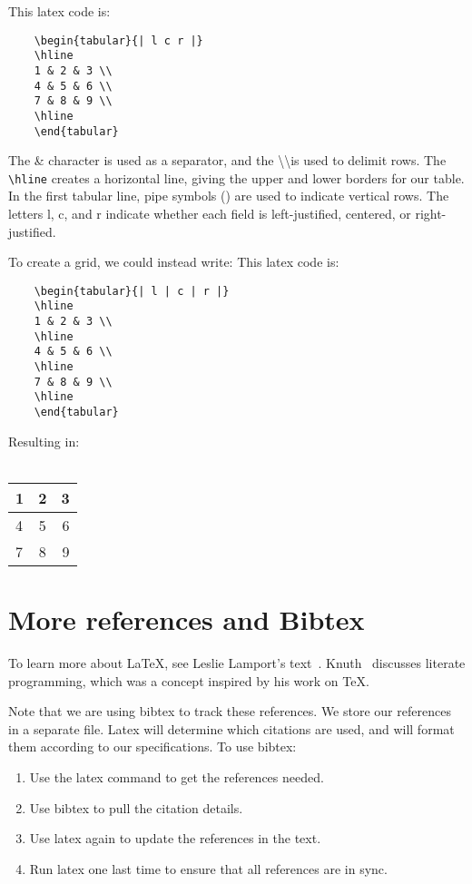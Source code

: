 \documentclass{article}
\begin{document}
\smallskip

This latex code is:
\begin{verbatim}
    \begin{tabular}{| l c r |}
    \hline
    1 & 2 & 3 \\
    4 & 5 & 6 \\
    7 & 8 & 9 \\
    \hline
    \end{tabular}
\end{verbatim}

The \& character is used as a separator,
and the \textbackslash\textbackslash is used to delimit rows.
The {\tt {\textbackslash}hline} creates a horizontal line,
giving the upper and lower borders for our table.
In the first tabular line, pipe symbols (\textbar) are used to indicate vertical rows.
The letters l, c, and r indicate whether each field is left-justified, centered,
or right-justified.

To create a grid, we could instead write:
This latex code is:

\begin{verbatim}
    \begin{tabular}{| l | c | r |}
    \hline
    1 & 2 & 3 \\
    \hline
    4 & 5 & 6 \\
    \hline
    7 & 8 & 9 \\
    \hline
    \end{tabular}
\end{verbatim}

\noindent
Resulting in:~\\~\\

    \begin{tabular}{| l | c | r |}
    \hline
    1 & 2 & 3 \\
    \hline
    4 & 5 & 6 \\
    \hline
    7 & 8 & 9 \\
    \hline
    \end{tabular}

\section{More references and Bibtex}\label{sec:bibtex}
To learn more about LaTeX,
see Leslie Lamport's text~\cite{lamport}.
Knuth~\cite{literate} discusses literate programming,
which was a concept inspired by his work on TeX.

Note that we are using bibtex to track these references.
We store our references in a separate file.
Latex will determine which citations are used,
and will format them according to our specifications.
To use bibtex:
\begin{enumerate}
\item Use the latex command  to get the references needed.
\item Use bibtex to pull the citation details.
\item Use latex again to update the  references in the text.
\item Run latex one last time to ensure that all references are in sync.
\end{enumerate}
\end{document}
